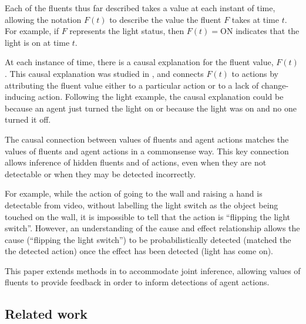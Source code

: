 \documentclass[10pt,journal,letterpaper,compsoc]{IEEEtran}
\begin{document}
Each of the fluents thus far described takes a value at each instant of time, allowing the notation $F(t)$ to describe the value the fluent $F$ takes at time $t$.  For example, if $F$ represents the light status, then $F(t) = \textrm{ON}$ indicates that the light is on at time $t$.  

At each instance of time, there is a causal explanation for the fluent value, $F(t)$.  This causal explanation was studied in \cite{morrow2012pami}, and connects $F(t)$ to actions by attributing the fluent value either to a particular action or to a lack of change-inducing action.    Following the light example, the causal explanation could be because an agent just turned the light on or because the light was on and no one turned it off.  

The causal connection between values of fluents and agent actions matches the values of fluents and agent actions in a commonsense way.  This key connection allows inference of hidden fluents and of actions, even when they are not detectable or when they may be detected incorrectly.  

For example, while the action of going to the wall and raising a hand is detectable from video, without labelling the light switch as the object being touched on the wall, it is impossible to tell  that the action is ``flipping the light switch''.  However, an understanding of the cause and effect relationship allows the cause (``flipping the light switch'') to be probabilistically detected (matched the the detected action) once the effect has been detected (light has come on). 

This paper extends methods in \cite{morrow2012pami} to accommodate joint inference, allowing values of fluents to provide feedback in order to inform detections of agent actions.


\subsection{Related work}




\end{document}
